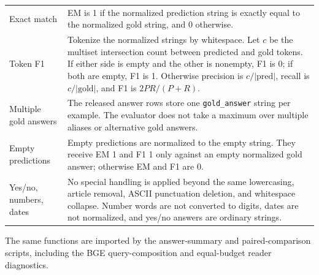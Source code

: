\documentclass[10pt]{article}
\begin{document}
\begin{table}[t]
\begin{threeparttable}
\begin{tabularx}{\textwidth}{>{\raggedright\arraybackslash}p{}
                            >{\raggedright\arraybackslash}X}
Exact match & EM is 1 if the normalized prediction string is exactly equal to the normalized gold string, and 0 otherwise. \\
Token F1 & Tokenize the normalized strings by whitespace. Let $c$ be the multiset intersection count between predicted and gold tokens. If either side is empty and the other is nonempty, F1 is 0; if both are empty, F1 is 1. Otherwise precision is $c/|\mathrm{pred}|$, recall is $c/|\mathrm{gold}|$, and F1 is $2PR/(P+R)$. \\
Multiple gold answers & The released answer rows store one \texttt{gold\_answer} string per example. The evaluator does not take a maximum over multiple aliases or alternative gold answers. \\
Empty predictions & Empty predictions are normalized to the empty string. They receive EM 1 and F1 1 only against an empty normalized gold answer; otherwise EM and F1 are 0. \\
Yes/no, numbers, dates & No special handling is applied beyond the same lowercasing, article removal, ASCII punctuation deletion, and whitespace collapse. Number words are not converted to digits, dates are not normalized, and yes/no answers are ordinary strings. \\
\bottomrule
\end{tabularx}
\begin{tablenotes}
\footnotesize
\item The same functions are imported by the answer-summary and paired-comparison scripts, including the BGE query-composition and equal-budget reader diagnostics.
\end{tablenotes}
\end{threeparttable}
\end{table}
\end{document}
